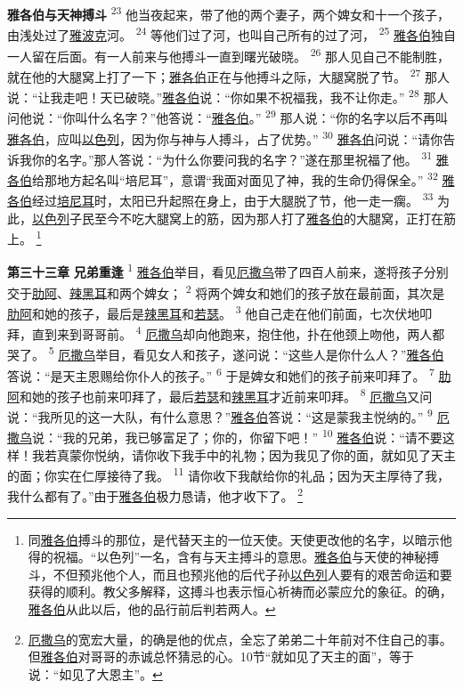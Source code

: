 \textbf{雅各伯与天神搏斗 }
\textsuperscript{23}
他当夜起来，带了他的两个妻子，两个婢女和十一个孩子，由浅处过了\uline{雅波克}河。
\textsuperscript{24}
等他们过了河，也叫自己所有的过了河，
\textsuperscript{25}
\uline{雅各伯}独自一人留在后面。有一人前来与他搏斗一直到曙光破晓。
\textsuperscript{26}
那人见自己不能制胜，就在他的大腿窝上打了一下；\uline{雅各伯}正在与他搏斗之际，大腿窝脱了节。
\textsuperscript{27}
那人说：“让我走吧！天已破晓。”\uline{雅各伯}说：“你如果不祝福我，我不让你走。”
\textsuperscript{28}
那人问他说：“你叫什么名字？”他答说：“\uline{雅各伯}。”
\textsuperscript{29}
那人说：“你的名字以后不再叫\uline{雅各伯}，应叫\uline{以色列}，因为你与神与人搏斗，占了优势。”
\textsuperscript{30}
\uline{雅各伯}问说：“请你告诉我你的名字。”那人答说：“为什么你要问我的名字？”遂在那里祝福了他。
\textsuperscript{31}
\uline{雅各伯}给那地方起名叫“培尼耳”，意谓“我面对面见了神，我的生命仍得保全。”
\textsuperscript{32}
\uline{雅各伯}经过\uline{培尼耳}时，太阳已升起照在身上，由于大腿脱了节，他一走一瘸。
\textsuperscript{33}
为此，\uline{以色列}子民至今不吃大腿窝上的筋，因为那人打了\uline{雅各伯}的大腿窝，正打在筋上。
\footnote{同\uline{雅各伯}搏斗的那位，是代替天主的一位天使。天使更改他的名字，以暗示他得的祝福。“以色列”一名，含有与天主搏斗的意思。\uline{雅各伯}与天使的神秘搏斗，不但预兆他个人，而且也预兆他的后代子孙\uline{以色列}人要有的艰苦命运和要获得的顺利。教父多解释，这搏斗也表示恒心祈祷而必蒙应允的象征。的确，\uline{雅各伯}从此以后，他的品行前后判若两人。}

\textbf{第三十三章 }
\textbf{兄弟重逢 }
\textsuperscript{1}
\uline{雅各伯}举目，看见\uline{厄撒乌}带了四百人前来，遂将孩子分别交于\uline{肋阿}、\uline{辣黑耳}和两个婢女；
\textsuperscript{2}
将两个婢女和她们的孩子放在最前面，其次是\uline{肋阿}和她的孩子，最后是\uline{辣黑耳}和\uline{若瑟}。
\textsuperscript{3}
他自己走在他们前面，七次伏地叩拜，直到来到哥哥前。
\textsuperscript{4}
\uline{厄撒乌}却向他跑来，抱住他，扑在他颈上吻他，两人都哭了。
\textsuperscript{5}
\uline{厄撒乌}举目，看见女人和孩子，遂问说：“这些人是你什么人？”\uline{雅各伯}答说：“是天主恩赐给你仆人的孩子。”
\textsuperscript{6}
于是婢女和她们的孩子前来叩拜了。
\textsuperscript{7}
\uline{肋阿}和她的孩子也前来叩拜了，最后\uline{若瑟}和\uline{辣黑耳}才近前来叩拜。
\textsuperscript{8}
\uline{厄撒乌}又问说：“我所见的这一大队，有什么意思？”\uline{雅各伯}答说：“这是蒙我主悦纳的。”
\textsuperscript{9}
\uline{厄撒乌}说：“我的兄弟，我已够富足了；你的，你留下吧！”
\textsuperscript{10}
\uline{雅各伯}说：“请不要这样！我若真蒙你悦纳，请你收下我手中的礼物；因为我见了你的面，就如见了天主的面；你实在仁厚接待了我。
\textsuperscript{11}
请你收下我献给你的礼品；因为天主厚待了我，我什么都有了。”由于\uline{雅各伯}极力恳请，他才收下了。
\footnote{\uline{厄撒乌}的宽宏大量，的确是他的优点，全忘了弟弟二十年前对不住自己的事。但\uline{雅各伯}对哥哥的赤诚总怀猜忌的心。10节“就如见了天主的面”，等于说：“如见了大恩主”。}

